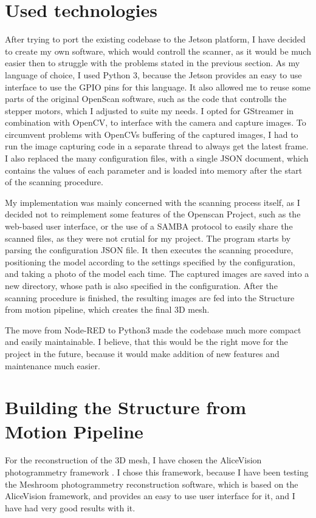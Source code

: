\section{Used technologies}
After trying to port the existing codebase to the Jetson platform, I have decided to create my own software, which would controll the scanner, as it would be much easier then to struggle with the problems stated in the previous section.
As my language of choice, I used Python 3, because the Jetson provides an easy to use interface to use the GPIO pins for this language.
It also allowed me to reuse some parts of the original OpenScan software, such as the code that controlls the stepper motors, which I adjusted to suite my needs.
I opted for GStreamer in combination with OpenCV, to interface with the camera and capture images.
To circumvent problems with OpenCVs buffering of the captured images, I had to run the image capturing code in a separate thread to always get the latest frame.
I also replaced the many configuration files, with a single JSON document, which contains the values of each parameter and is loaded into memory after the start of the scanning procedure.

My implementation was mainly concerned with the scanning process itself, as I decided not to reimplement some features of the Openscan Project, such as the web-based user interface, or the use of a SAMBA protocol to easily share the scanned files, as they were not crutial for my project.
The program starts by parsing the configuration JSON file.
It then executes the scanning procedure, positioning the model according to the settings specified by the configuration, and taking a photo of the model each time.
The captured images are saved into a new directory, whose path is also specified in the configuration.
After the scanning procedure is finished, the resulting images are fed into the Structure from motion pipeline, which creates the final 3D mesh.

The move from Node-RED to Python3 made the codebase much more compact and easily maintainable.
I believe, that this would be the right move for the project in the future, because it would make addition of new features and maintenance much easier.

\section{Building the Structure from Motion Pipeline}

For the reconstruction of the 3D mesh, I have chosen the AliceVision photogrammetry framework \cite{Moulon2012, Jancosek2011}.
I chose this framework, because I have been testing the Meshroom photogrammetry reconstruction software, which is based on the AliceVision framework, and provides an easy to use user interface for it, and I have had very good results with it.

